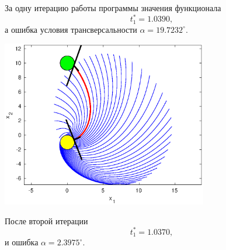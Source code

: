 \documentclass[11pt]{article}
\begin{document}
За одну итерацию работы программы значения функционала 
$$t_1^* = 1.0390,$$
а ошибка условия трансверсальности  $\alpha = 19.7232^\circ$.

\begin{center}
\includegraphics[width=90mm]{2xx_it1.eps}
\end{center}
 
После второй итерации
$$ t_1^* = 1.0370, $$
и ошибка $\alpha = 2.3975^\circ$.
\end{document}
